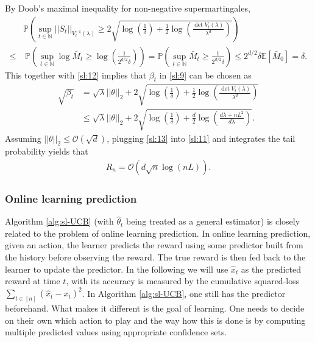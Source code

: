 \documentclass[10pt,a4article]{article}
\numberwithin{equation}{section}
\theoremstyle{plain}
\theoremstyle{definition}
\def\N{{\mathbb N}}
\def\E{{\mathbb E}}
\def\P{{\mathbb P}}
\def\t{{\theta}}
\begin{document}
By Doob's maximal inequality for non-negative supermartingales, 
\begin{align*}
&\P\left(\sup_{t\in\N}||S_t||_{V^{-1}_t(\lambda)}\geq 2\sqrt{\log\left(\frac{1}{\delta}\right)+\frac{1}{2}\log\left(\frac{\det V_t(\lambda)}{\lambda^d}\right)}\right)\\
\leq&\ \P\left(\sup_{t\in\N}\log\bar{M}_t\geq\log\left(\frac{1}{2^{d/2}\delta}\right)\right) = \P\left(\sup_{t\in\N}\bar{M}_t\geq \frac{1}{2^{d/2}\delta}\right)\leq 2^{d/2}\delta\E[\bar{M}_0]=\delta. 
\end{align*}
This together with \eqref{sl:12} implies that $\beta_t$ in \eqref{sl:9} can be chosen as 
\begin{align}
\sqrt{\beta_t} &= \sqrt{\lambda}||\t||_2+2\sqrt{\log\left(\frac{1}{\delta}\right)+\frac{1}{2}\log\left(\frac{\det V_t(\lambda)}{\lambda^d}\right)}\nonumber\\
&\leq\sqrt{\lambda}||\t||_2+2\sqrt{\log\left(\frac{1}{\delta}\right)+\frac{d}{2}\log\left(\frac{d\lambda+nL^2}{d\lambda}\right)}\label{sl:13}.
\end{align}
Assuming $||\t||_2\leq\mathcal O(\sqrt{d})$, plugging \eqref{sl:13} into \eqref{sl:11} and integrates the tail probability yields that 
\begin{align*}
R_n = \mathcal O \left(d\sqrt{n}\log (nL)\right).
\end{align*}

\subsubsection{Online learning prediction}\label{sec:olp}

Algorithm \ref{alg:sl-UCB} (with $\hat{\t}_t$ being treated as a general estimator) is closely related to the problem of online learning prediction. 
In online learning prediction, given an action, the learner predicts the reward using some predictor built from the history before observing the reward. 
The true reward is then fed back to the learner to update the predictor. 
In the following we will use $\hat{x}_t$ as the predicted reward at time $t$, with its accuracy is measured by the cumulative squared-loss $\sum_{t\in [n]}(\hat{x}_t-x_t)^2$. 
In Algorithm \ref{alg:sl-UCB}, one still has the predictor beforehand. What makes it different is the goal of learning. One needs to decide on their own which action to play and the way how this is done is by computing multiple predicted values using appropriate confidence sets. 
\end{document}
